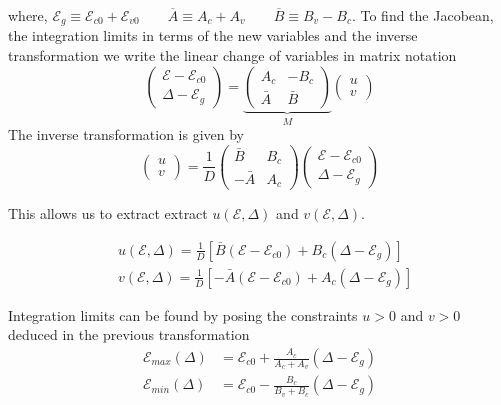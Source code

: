 where, $\mathcal{E}_{g} \equiv \mathcal{E}_{c0}+\mathcal{E}_{v 0} \quad\quad\overline{A}   \equiv A_{c}+A_{v} \quad\quad\overline{B}   \equiv B_{v}-B_{c}$. To find the Jacobean, the integration limits in terms of the new variables and the inverse transformation we write the linear change of variables in matrix notation
\begin{equation}
\begin{pmatrix} \mathcal{E} - \mathcal{E}_{c0} \\ \Delta - \mathcal{E}_g \end{pmatrix} = \underbrace{ \begin{pmatrix} A_c & -B_c \\ \bar{A} & \bar{B} \end{pmatrix}  }_{ M }\begin{pmatrix} u \\ v \end{pmatrix}
\label{eq:quadratic_interband_matrix_transform}
\end{equation}
The inverse transformation is given by
\begin{equation}
\begin{pmatrix} u \\ v \end{pmatrix} = \frac{1}{D}\begin{pmatrix}
\bar{B} & B_{c} \\ -\bar{A} & A_{c}\end{pmatrix}\begin{pmatrix} \mathcal{E} - \mathcal{E}_{c0} \\ \Delta - \mathcal{E}_g \end{pmatrix}
\label{eq:quadratic_interband_inverse_transform}
\end{equation}

This allows us to extract extract $u(\mathcal{E},\Delta)$ and $v(\mathcal{E},\Delta)$. 

\begin{align}
&u(\mathcal{E}, \Delta)= \frac{1}{D} \left[ \bar{B}(\mathcal{E} - \mathcal{E}_{c0}) + B_c(\Delta - \mathcal{E}_g) \right]
\\  
&v(\mathcal{E}, \Delta) = \frac{1}{D} \left[ -\bar{A}(\mathcal{E} - \mathcal{E}_{c0}) + A_c(\Delta - \mathcal{E}_g) \right]
\end{align}

Integration limits can be found by posing the constraints $u>0$ and $v>0$ deduced in the previous transformation
\begin{align}
\mathcal{E}_{max}(\Delta) &= \mathcal{E}_{c 0 } + \frac{A_{c}}{A_{c} + A_{v}}(\Delta - \mathcal{E}_{g}) \\
\mathcal{E}_{min}(\Delta) &= \mathcal{E}_{c 0 } - \frac{B_{c}}{B_{v} + B_{c}}(\Delta - \mathcal{E}_{g})
\label{eq:quadratic_interband_energy_limits}
\end{align}

